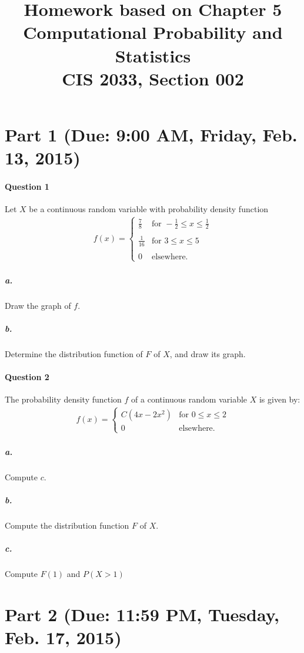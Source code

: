 \documentclass[11pt]{article} %
\title{Homework based on Chapter 5\\
Computational Probability and Statistics \\
CIS 2033, Section 002}
\author{}
\date{} %
\begin{document}
\maketitle

\section{Part 1 (Due: 9:00 AM, Friday, Feb. 13, 2015)}

\paragraph*{\bf Question 1} Let $X$ be a continuous random variable with probability density function\\
\begin{align*}
f(x) = \left\lbrace
\begin{array}{ll} 
\frac{7}{8} & \text{for } -\frac{1}{2} \leq x \leq \frac{1}{2} \\
& \\
\frac{1}{16} & \text{for } 3 \leq x \leq 5 \\ 
& \\
0 & \text{elsewhere.}
\end{array}
\right.
\end{align*}

\subparagraph*{a.} Draw the graph of $f$.
\subparagraph*{b.} Determine the distribution function of $F$ of $X$, and draw its graph. 


\paragraph*{\bf Question 2} The probability density function $f$ of a continuous random variable $X$ is given by: 
\begin{align*}
f(x) = \left\lbrace
\begin{array}{ll}
C(4x - 2x^2)  & \text{for } 0 \leq x \leq 2 \\
0 & \text{elsewhere.}
\end{array} \right.
\end{align*}

\subparagraph*{a.} Compute $c$. 
\subparagraph*{b.} Compute the distribution function $F$ of $X$.
\subparagraph*{c.} Compute $F(1)$ and $P(X>1)$
\vspace{8em}
\section{Part 2 (Due: 11:59 PM, Tuesday, Feb. 17, 2015)}
\end{document}
